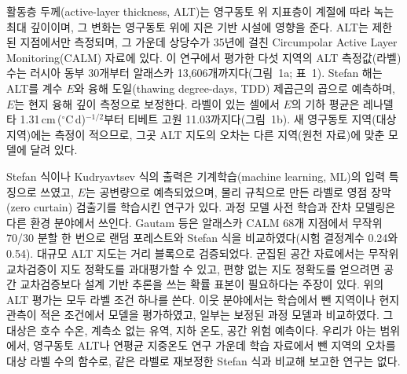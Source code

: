 
활동층 두께(active-layer thickness, ALT)는 영구동토 위 지표층이 계절에 따라 녹는 최대 깊이이며, 그 변화는 영구동토 위에 지은 기반 시설에 영향을 준다\cite{Karjalainen2019,Ran2022b}. ALT는 제한된 지점에서만 측정되며, 그 가운데 상당수가 35년에 걸친 Circumpolar Active Layer Monitoring(CALM) 자료에 있다\cite{Streletskiy2025}. 이 연구에서 평가한 다섯 지역의 ALT 측정값(라벨) 수는 러시아 동부 30개부터 알래스카 13,606개까지다(그림~1a; 표~1). Stefan 해\cite{Stefan1891}는 ALT를 계수 $E$와 융해 도일(thawing degree-days, TDD) 제곱근의 곱으로 예측하며, $E$는 현지 융해 깊이 측정으로 보정한다\cite{Nelson1997}. 라벨이 있는 셀에서 $E$의 기하 평균은 레나델타 1.31\,cm\,($^{\circ}$C\,d)$^{-1/2}$부터 티베트 고원 11.03까지다(그림~1b). 새 영구동토 지역(대상 지역)에는 측정이 적으므로, 그곳 ALT 지도의 오차는 다른 지역(원천 자료)에 맞춘 모델에 달려 있다.

Stefan 식이나 Kudryavtsev 식의 출력은 기계학습(machine learning, ML)의 입력 특징으로 쓰였고\cite{Pilyugina2025,WangG2025}, $E$는 공변량으로 예측되었으며\cite{Ran2022b,ZhangC2024}, 물리 규칙으로 만든 라벨로 영점 장막(zero curtain) 검출기를 학습시킨 연구가 있다\cite{Gay2026}. 과정 모델 사전 학습과 잔차 모델링은 다른 환경 분야에서 쓰인다\cite{Read2019,Jia2021,Willard2022}. Gautam 등은 알래스카 CALM 68개 지점에서 무작위 70/30 분할 한 번으로 랜덤 포레스트와 Stefan 식을 비교하였다(시험 결정계수 0.24와 0.54)\cite{Gautam2025}. 대규모 ALT 지도는 거리 블록으로 검증되었다\cite{Aalto2018,Karjalainen2019,Ran2022a}. 군집된 공간 자료에서는 무작위 교차검증이 지도 정확도를 과대평가할 수 있고\cite{Roberts2017,Ploton2020,MeyerPebesma2022}, 편향 없는 지도 정확도를 얻으려면 공간 교차검증보다 설계 기반 추론을 쓰는 확률 표본이 필요하다는 주장이 있다\cite{Wadoux2021}. 위의 ALT 평가는 모두 라벨 조건 하나를 쓴다. 이웃 분야에서는 학습에서 뺀 지역이나 현지 관측이 적은 조건에서 모델을 평가하였고, 일부는 보정된 과정 모델과 비교하였다. 그 대상은 호수 수온\cite{Read2019,Jia2021,Willard2021}, 계측소 없는 유역\cite{Pool2019,Feng2023}, 지하 온도\cite{OMalley2026}, 공간 위험 예측\cite{Portes2026}이다. 우리가 아는 범위에서, 영구동토 ALT나 연평균 지중온도 연구 가운데 학습 자료에서 뺀 지역의 오차를 대상 라벨 수의 함수로, 같은 라벨로 재보정한 Stefan 식과 비교해 보고한 연구는 없다.

